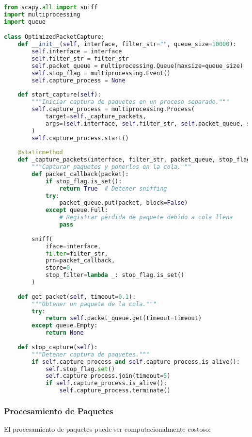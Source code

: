 \begin{lstlisting}[language=python, caption=Captura de Paquetes Optimizada]
from scapy.all import sniff
import multiprocessing
import queue

class OptimizedPacketCapture:
    def __init__(self, interface, filter_str="", queue_size=10000):
        self.interface = interface
        self.filter_str = filter_str
        self.packet_queue = multiprocessing.Queue(maxsize=queue_size)
        self.stop_flag = multiprocessing.Event()
        self.capture_process = None
        
    def start_capture(self):
        """Iniciar captura de paquetes en un proceso separado."""
        self.capture_process = multiprocessing.Process(
            target=self._capture_packets,
            args=(self.interface, self.filter_str, self.packet_queue, self.stop_flag)
        )
        self.capture_process.start()
        
    @staticmethod
    def _capture_packets(interface, filter_str, packet_queue, stop_flag):
        """Capturar paquetes y ponerlos en la cola."""
        def packet_callback(packet):
            if stop_flag.is_set():
                return True  # Detener sniffing
            try:
                packet_queue.put(packet, block=False)
            except queue.Full:
                # Registrar pérdida de paquete debido a cola llena
                pass
            
        sniff(
            iface=interface,
            filter=filter_str,
            prn=packet_callback,
            store=0,
            stop_filter=lambda _: stop_flag.is_set()
        )
        
    def get_packet(self, timeout=0.1):
        """Obtener un paquete de la cola."""
        try:
            return self.packet_queue.get(timeout=timeout)
        except queue.Empty:
            return None
            
    def stop_capture(self):
        """Detener captura de paquetes."""
        if self.capture_process and self.capture_process.is_alive():
            self.stop_flag.set()
            self.capture_process.join(timeout=5)
            if self.capture_process.is_alive():
                self.capture_process.terminate()
\end{lstlisting}

\subsubsection{Procesamiento de Paquetes}
El procesamiento de paquetes puede ser computacionalmente costoso:

